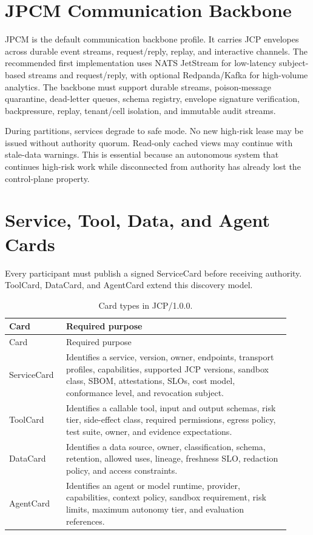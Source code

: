 \documentclass[12pt,journal,onecolumn,draftclsnofoot]{IEEEtran}
\begin{document}
\section{JPCM Communication Backbone}
JPCM is the default communication backbone profile. It carries JCP envelopes across durable event streams, request/reply, replay, and interactive channels. The recommended first implementation uses NATS JetStream for low-latency subject-based streams and request/reply, with optional Redpanda/Kafka for high-volume analytics. The backbone must support durable streams, poison-message quarantine, dead-letter queues, schema registry, envelope signature verification, backpressure, replay, tenant/cell isolation, and immutable audit streams.

During partitions, services degrade to safe mode. No new high-risk lease may be issued without authority quorum. Read-only cached views may continue with stale-data warnings. This is essential because an autonomous system that continues high-risk work while disconnected from authority has already lost the control-plane property.

\section{Service, Tool, Data, and Agent Cards}
Every participant must publish a signed ServiceCard before receiving authority. ToolCard, DataCard, and AgentCard extend this discovery model.

\begin{longtable}{p{0.18\linewidth}p{0.74\linewidth}}
\caption{Card types in JCP/1.0.0.}\label{tab:cards}\\
\toprule
Card & Required purpose \\
\midrule
\endfirsthead
\toprule
Card & Required purpose \\
\midrule
\endhead
ServiceCard & Identifies a service, version, owner, endpoints, transport profiles, capabilities, supported JCP versions, sandbox class, SBOM, attestations, SLOs, cost model, conformance level, and revocation subject. \\
ToolCard & Identifies a callable tool, input and output schemas, risk tier, side-effect class, required permissions, egress policy, test suite, owner, and evidence expectations. \\
DataCard & Identifies a data source, owner, classification, schema, retention, allowed uses, lineage, freshness SLO, redaction policy, and access constraints. \\
AgentCard & Identifies an agent or model runtime, provider, capabilities, context policy, sandbox requirement, risk limits, maximum autonomy tier, and evaluation references. \\
\bottomrule
\end{longtable}
\end{document}
